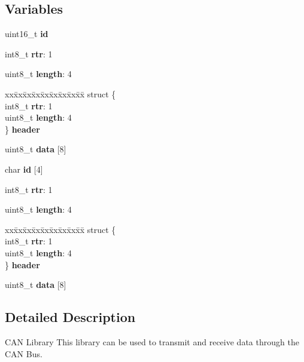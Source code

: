 \subsection*{\-Variables}
\begin{DoxyCompactItemize}
\item 
uint16\-\_\-t {\bfseries id}\label{group__can_ga4fc3a0c58dfbd1e68224521185cb9384}

\item 
int8\-\_\-t {\bfseries rtr}\-: 1
\item 
uint8\-\_\-t {\bfseries length}\-: 4
\item 
\begin{tabbing}
xx\=xx\=xx\=xx\=xx\=xx\=xx\=xx\=xx\=\kill
struct \{\\
\>int8\_t {\bfseries rtr}: 1\\
\>uint8\_t {\bfseries length}: 4\\
\} {\bfseries header}\label{group__can_ga76b6f19e40d69446867ff4650225f0a1}
\\

\end{tabbing}\item 
uint8\-\_\-t {\bfseries data} [8]\label{group__can_gafb87d045bbf32b236fc425efe02bdc7b}

\item 
char {\bfseries id} [4]\label{group__can_gace593da5319500315498c8f845ee2368}

\item 
int8\-\_\-t {\bfseries rtr}\-: 1
\item 
uint8\-\_\-t {\bfseries length}\-: 4
\item 
\begin{tabbing}
xx\=xx\=xx\=xx\=xx\=xx\=xx\=xx\=xx\=\kill
struct \{\\
\>int8\_t {\bfseries rtr}: 1\\
\>uint8\_t {\bfseries length}: 4\\
\} {\bfseries header}\label{group__can_ga16dcd6dee09e1abfcc9597f67b3b2c32}
\\

\end{tabbing}\item 
uint8\-\_\-t {\bfseries data} [8]\label{group__can_gafb87d045bbf32b236fc425efe02bdc7b}

\end{DoxyCompactItemize}


\subsection{\-Detailed \-Description}
\-C\-A\-N \-Library \-This library can be used to transmit and receive data through the \-C\-A\-N \-Bus. 

